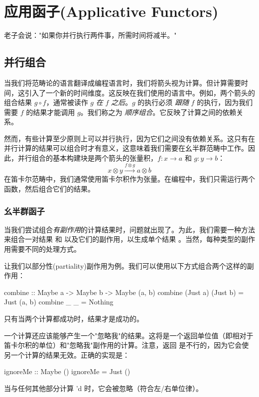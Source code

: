 \documentclass[DaoFP]{subfiles}
\begin{document}
\setcounter{chapter}{13}

\chapter{应用函子(Applicative Functors)}

老子会说："如果你并行执行两件事，所需时间将减半。"

\section{并行组合}

当我们将范畴论的语言翻译成编程语言时，我们将箭头视为计算。但计算需要时间，这引入了一个新的时间维度。这反映在我们使用的语言中。例如，两个箭头的组合结果 $g \circ f$，通常被读作 $g$ \emph{在} $f$ \emph{之后}。$g$ 的执行必须 \emph{跟随} $f$ 的执行，因为我们需要 $f$ 的结果才能调用 $g$。我们称之为 \emph{顺序组合}。它反映了计算之间的依赖关系。

然而，有些计算至少原则上可以并行执行，因为它们之间没有依赖关系。这只有在并行计算的结果可以组合时才有意义，这意味着我们需要在幺半群范畴中工作。因此，并行组合的基本构建块是两个箭头的张量积，$f \colon x \to a$ 和 $g \colon y \to b$：
\[ x \otimes y \xrightarrow{f \otimes g} a \otimes b \]
在笛卡尔范畴中，我们通常使用笛卡尔积作为张量。在编程中，我们只需运行两个函数，然后组合它们的结果。

\subsection{幺半群函子}

当我们尝试组合\emph{有副作用}的计算结果时，问题就出现了。为此，我们需要一种方法来组合一对结果  和  以及它们的副作用，以生成单个结果 。当然，每种类型的副作用需要不同的处理方式。

让我们以部分性(partiality)副作用为例。我们可以使用以下方式组合两个这样的副作用：
\begin{haskell}
combine :: Maybe a -> Maybe b -> Maybe (a, b)
combine (Just a) (Just b) = Just (a, b)
combine _ _ = Nothing
\end{haskell}
只有当两个计算都成功时，结果才是成功的。

一个计算还应该能够产生一个"忽略我"的结果。这将是一个返回单位值（即相对于笛卡尔积的单位）和"忽略我"副作用的计算。注意，返回  是不行的，因为它会使另一个计算的结果无效。正确的实现是：
\begin{haskell}
ignoreMe :: Maybe ()
ignoreMe = Just ()
\end{haskell}
当与任何其他部分计算 'd 时，它会被忽略（符合左/右单位律）。
\end{document}
